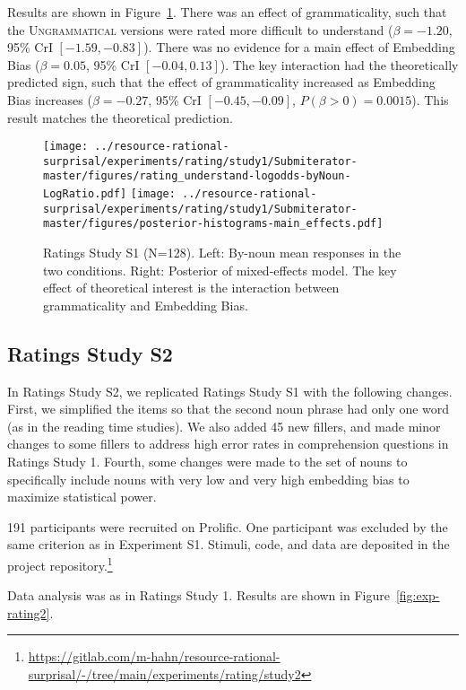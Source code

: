 Results are shown in Figure~\ref{fig:expt-rating1}.
There was an effect of grammaticality, such that the \textsc{Ungrammatical} versions were rated more difficult to understand ($\beta=-1.20$, 95\% CrI $[-1.59, -0.83]$).
There was no evidence for a main effect of Embedding Bias ($\beta=0.05$, 95\% CrI $[-0.04, 0.13]$).
The key interaction had the theoretically predicted sign, such that the effect of grammaticality increased as Embedding Bias increases ($\beta=-0.27$, 95\% CrI $[-0.45, -0.09]$, $P(\beta>0) = 0.0015$).
This result matches the theoretical prediction.

\begin{figure}
	\centering
    \texttt{[image: ../resource-rational-surprisal/experiments/rating/study1/Submiterator-master/figures/rating\_understand-logodds-byNoun-LogRatio.pdf]}
	\texttt{[image: ../resource-rational-surprisal/experiments/rating/study1/Submiterator-master/figures/posterior-histograms-main\_effects.pdf]}


	\caption{Ratings Study S1 (N=128). Left: By-noun mean responses in the two conditions. Right: Posterior of mixed-effects model. The key effect of theoretical interest is the interaction between grammaticality and Embedding Bias.}\label{fig:expt-rating1}
\end{figure}


\subsection{Ratings Study S2}\label{sec:ratings-2}


In Ratings Study S2, we replicated Ratings Study S1 with the following changes.
First, we simplified the items so that the second noun phrase had only one word (as in the reading time studies).
We also added 45 new fillers, and made minor changes to some fillers to address high error rates in comprehension questions in Ratings Study 1.
Fourth, some changes were made to the set of nouns to specifically include nouns with very low and very high embedding bias to maximize statistical power.

191 participants were recruited on Prolific.
One participant was excluded by the same criterion as in Experiment S1.
Stimuli, code, and data are deposited in the project repository.\footnote{\url{https://gitlab.com/m-hahn/resource-rational-surprisal/-/tree/main/experiments/rating/study2}}

Data analysis was as in Ratings Study 1.
Results are shown in Figure~\ref{fig:exp-rating2}.

